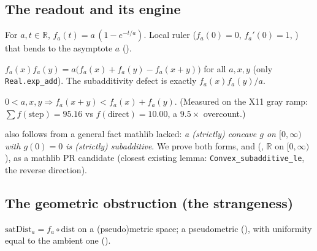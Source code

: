\subsection{The readout and its engine}

\begin{definition}\label{def:f}\leanok
For $a,t\in\mathbb{R}$, $f_a(t)=a\,(1-e^{-t/a})$. Local ruler ($f_a(0)=0$,
$f_a'(0)=1$, ) that bends to the asymptote $a$
().
\end{definition}

\begin{lemma}\label{lem:key}\leanok
$f_a(x)f_a(y)=a\bigl(f_a(x)+f_a(y)-f_a(x+y)\bigr)$ for all $a,x,y$ (only
\texttt{Real.exp\_add}). The subadditivity defect is exactly $f_a(x)f_a(y)/a$.
\end{lemma}

\begin{lemma}[Strict subadditivity = diminishing returns]\label{lem:subadd}
\leanok
$0<a,x,y \Rightarrow f_a(x+y)<f_a(x)+f_a(y)$. (Measured on the X11 gray ramp:
$\sum f(\text{step})=95.16$ vs $f(\text{direct})=10.00$, a $9.5\times$ overcount.)
\end{lemma}

\begin{remark}\label{rem:concave}
 also follows from a general fact mathlib lacked:
\emph{a (strictly) concave $g$ on $[0,\infty)$ with $g(0)=0$ is (strictly)
subadditive}. We prove both forms,
 and
 (\leanok, $\mathbb{R}$ on
$[0,\infty)$), as a mathlib PR candidate (closest existing lemma:
\texttt{Convex\_subadditive\_le}, the reverse direction).
\end{remark}

\subsection{The geometric obstruction (the strangeness)}

\begin{definition}\label{def:satdist}\leanok
$\mathrm{satDist}_a=f_a\circ\mathrm{dist}$ on a (pseudo)metric space; a pseudometric
(), with uniformity equal to the ambient one
().
\end{definition}

